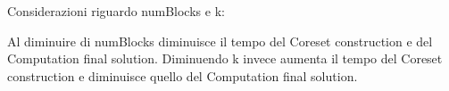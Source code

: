 \documentclass[10pt]{article}
\begin{document}
Considerazioni riguardo numBlocks e k:

Al diminuire di numBlocks diminuisce il tempo del Coreset construction e del Computation final solution. Diminuendo k invece aumenta il tempo del Coreset construction e diminuisce quello del Computation final solution.





 
\end{document}
